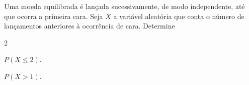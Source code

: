%
%


\begin{exercicioBanco}[\valorquestao]
Uma moeda equilibrada é lançada sucessivamente, de modo independente, até que ocorra a primeira cara. Seja \(X\) a variável aleatória que conta o número de lançamentos anteriores à ocorrência de cara. Determine
%
\begin{enumerate}[(a)]
    \begin{multicols}{2}
        \item \(P(X \le 2)\).
        \item \(P(X > 1)\).
    \end{multicols}
\end{enumerate}
%
\end{exercicioBanco}

